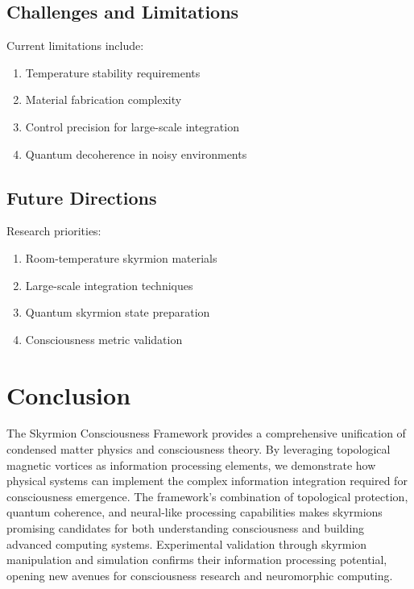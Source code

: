 \documentclass[12pt,a4paper]{article}
\begin{document}
\subsection{Challenges and Limitations}

Current limitations include:
\begin{enumerate}
    \item Temperature stability requirements
    \item Material fabrication complexity
    \item Control precision for large-scale integration
    \item Quantum decoherence in noisy environments
\end{enumerate}

\subsection{Future Directions}

Research priorities:
\begin{enumerate}
    \item Room-temperature skyrmion materials
    \item Large-scale integration techniques
    \item Quantum skyrmion state preparation
    \item Consciousness metric validation
\end{enumerate}

\section{Conclusion}

The Skyrmion Consciousness Framework provides a comprehensive unification of condensed matter physics and consciousness theory. By leveraging topological magnetic vortices as information processing elements, we demonstrate how physical systems can implement the complex information integration required for consciousness emergence. The framework's combination of topological protection, quantum coherence, and neural-like processing capabilities makes skyrmions promising candidates for both understanding consciousness and building advanced computing systems. Experimental validation through skyrmion manipulation and simulation confirms their information processing potential, opening new avenues for consciousness research and neuromorphic computing.



\end{document}
